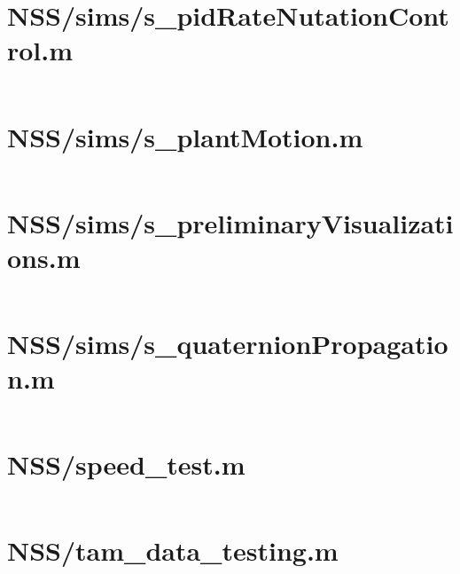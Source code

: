 \pagebreak
\section*{NSS/sims/s\_pidRateNutationControl.m}\label{code:NSS/sims/s_pidRateNutationControl.m}
\inputminted[linenos,fontsize=\scriptsize]{matlab}{/home/dcouture/git/mathyourlife/TSatPy/beta_versions/matlab_object_oriented/sims/s_pidRateNutationControl.m}

\pagebreak
\section*{NSS/sims/s\_plantMotion.m}\label{code:NSS/sims/s_plantMotion.m}
\inputminted[linenos,fontsize=\scriptsize]{matlab}{/home/dcouture/git/mathyourlife/TSatPy/beta_versions/matlab_object_oriented/sims/s_plantMotion.m}

\pagebreak
\section*{NSS/sims/s\_preliminaryVisualizations.m}\label{code:NSS/sims/s_preliminaryVisualizations.m}
\inputminted[linenos,fontsize=\scriptsize]{matlab}{/home/dcouture/git/mathyourlife/TSatPy/beta_versions/matlab_object_oriented/sims/s_preliminaryVisualizations.m}

\pagebreak
\section*{NSS/sims/s\_quaternionPropagation.m}\label{code:NSS/sims/s_quaternionPropagation.m}
\inputminted[linenos,fontsize=\scriptsize]{matlab}{/home/dcouture/git/mathyourlife/TSatPy/beta_versions/matlab_object_oriented/sims/s_quaternionPropagation.m}

\pagebreak
\section*{NSS/speed\_test.m}\label{code:NSS/speed_test.m}
\inputminted[linenos,fontsize=\scriptsize]{matlab}{/home/dcouture/git/mathyourlife/TSatPy/beta_versions/matlab_object_oriented/speed_test.m}

\pagebreak
\section*{NSS/tam\_data\_testing.m}\label{code:NSS/tam_data_testing.m}
\inputminted[linenos,fontsize=\scriptsize]{matlab}{/home/dcouture/git/mathyourlife/TSatPy/beta_versions/matlab_object_oriented/tam_data_testing.m}

